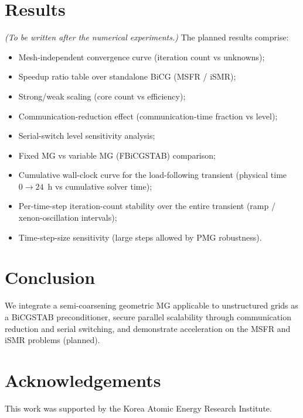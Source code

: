 \documentclass[review]{elsarticle}
\begin{document}
\section{Results}
\label{Section:Results}
\emph{(To be written after the numerical experiments.)} The planned results comprise:
\begin{itemize}
  \item Mesh-independent convergence curve (iteration count vs unknowns);
  \item Speedup ratio table over standalone BiCG (MSFR / iSMR);
  \item Strong/weak scaling (core count vs efficiency);
  \item Communication-reduction effect (communication-time fraction vs level);
  \item Serial-switch level sensitivity analysis;
  \item Fixed MG vs variable MG (FBiCGSTAB) comparison;
  \item Cumulative wall-clock curve for the load-following transient (physical time $0 \to 24$~h vs cumulative solver time);
  \item Per-time-step iteration-count stability over the entire transient (ramp / xenon-oscillation intervals);
  \item Time-step-size sensitivity (large steps allowed by PMG robustness).
\end{itemize}

\section{Conclusion}
\label{Section:Conclusion}
We integrate a semi-coarsening geometric MG applicable to unstructured grids as a BiCGSTAB preconditioner, secure parallel scalability through communication reduction and serial switching, and demonstrate acceleration on the MSFR and iSMR problems (planned).

\section*{Acknowledgements}
This work was supported by the Korea Atomic Energy Research Institute.

\clearpage

\end{document}
